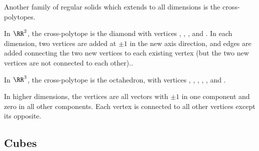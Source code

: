 \documentclass[fleqn]{report}
\begin{document}
Another family of regular solids which extends to all
dimensions is the cross-polytopes. 
\begin{smallitemize}
\item In $\RR^2$, the cross-polytope is the diamond with
vertices ,
,
, and
. In each dimension, two
vertices are added at $\pm 1$ in the new axis direction, and
edges are added connecting the two new vertices to each
existing vertex (but the two new vertices are not connected to
each other).. 
\item In $\RR^3$, the cross-polytope is the octahedron, with
vertices
, 
, 
, 
, 
, and
. 
\item In higher dimensions, the vertices are all vectors with
$\pm 1$ in one component and zero in all other components.
Each vertex is connected to all other vertices except its
opposite.
\end{smallitemize}

\subsection{Cubes}
\label{cubes}
\end{document}
